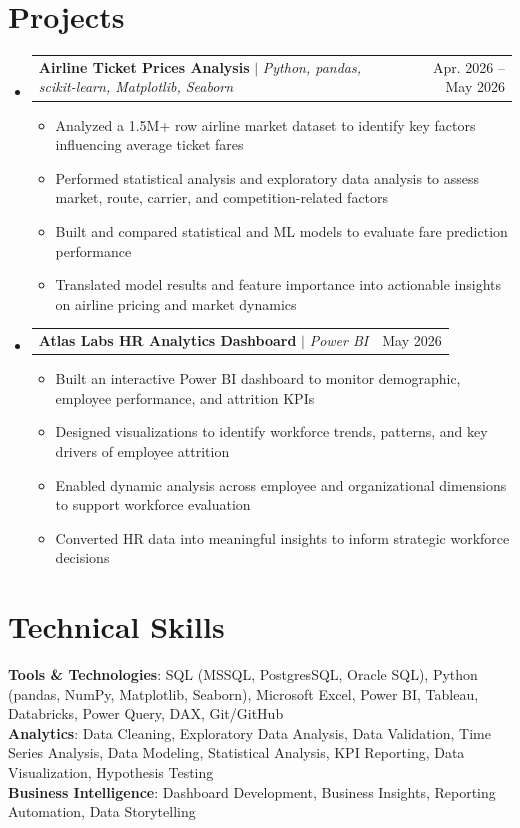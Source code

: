 \documentclass[letterpaper,11pt]{article}
\makeatletter
\newcommand{\resumeItem}[1]{
  \item\small{
    {#1 \vspace{-2pt}}
  }
}
\newcommand{\resumeProjectHeading}[2]{
    \item
    \begin{tabular*}{0.97\textwidth}{l@{\extracolsep{\fill}}r}
      \small#1 & #2 \\
    \end{tabular*}\vspace{-7pt}
}
\newcommand{\resumeSubHeadingListStart}{\begin{itemize}[leftmargin=0.15in, label={}]}
\newcommand{\resumeSubHeadingListEnd}{\end{itemize}}
\newcommand{\resumeItemListStart}{\begin{itemize}}
\newcommand{\resumeItemListEnd}{\end{itemize}\vspace{-5pt}}
\makeatother
\begin{document}
\section{Projects}
    \resumeSubHeadingListStart
      \resumeProjectHeading
          {\textbf{Airline Ticket Prices Analysis} $|$ \emph{Python, pandas, scikit-learn, Matplotlib, Seaborn}}{Apr. 2026 -- May 2026}
          \resumeItemListStart
            \resumeItem{Analyzed a 1.5M+ row airline market dataset to identify key factors influencing average ticket fares}
            \resumeItem{Performed statistical analysis and exploratory data analysis to assess market, route, carrier, and competition-related factors}
            \resumeItem{Built and compared statistical and ML models to evaluate fare prediction performance}
            \resumeItem{Translated model results and feature importance into actionable insights on airline pricing and market dynamics}
          \resumeItemListEnd
      \resumeProjectHeading
          {\textbf{Atlas Labs HR Analytics Dashboard} $|$ \emph{Power BI}}{May 2026}
          \resumeItemListStart
            \resumeItem{Built an interactive Power BI dashboard to monitor demographic, employee performance, and attrition KPIs}
            \resumeItem{Designed visualizations to identify workforce trends, patterns, and key drivers of employee attrition}
            \resumeItem{Enabled dynamic analysis across employee and organizational dimensions to support workforce evaluation}
            \resumeItem{Converted HR data into meaningful insights to inform strategic workforce decisions}
          \resumeItemListEnd
    \resumeSubHeadingListEnd



%
\section{Technical Skills}
 \begin{itemize}[leftmargin=0.15in, label={}]
    \small{\item{
     \textbf{Tools \& Technologies}{: SQL (MSSQL, PostgresSQL, Oracle SQL), Python (pandas, NumPy, Matplotlib, Seaborn), Microsoft Excel, Power BI, Tableau, Databricks, Power Query, DAX, Git/GitHub} \\
     \textbf{Analytics}{: Data Cleaning, Exploratory Data Analysis, Data Validation, Time Series Analysis, Data Modeling, Statistical Analysis, KPI Reporting, Data Visualization, Hypothesis Testing} \\
     \textbf{Business Intelligence}{: Dashboard Development, Business Insights, Reporting Automation, Data Storytelling}
    }}
 \end{itemize}


\end{document}

